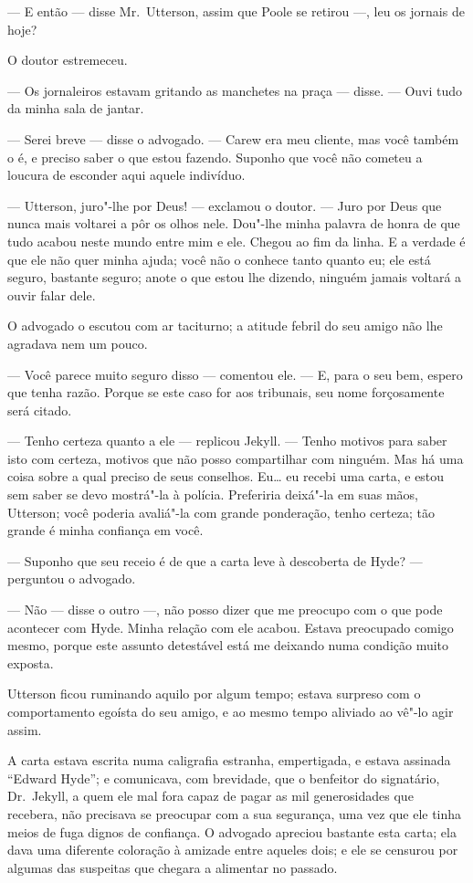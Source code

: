 --- E então --- disse Mr.~Utterson, assim que Poole se retirou ---, leu os
jornais de hoje?

O doutor estremeceu.

--- Os jornaleiros estavam gritando as manchetes na praça --- disse. ---
Ouvi tudo da minha sala de jantar.

--- Serei breve --- disse o advogado. --- Carew era meu cliente, mas você
também o é, e preciso saber o que estou fazendo. Suponho que você não
cometeu a loucura de esconder aqui aquele indivíduo.

--- Utterson, juro"-lhe por Deus! --- exclamou o doutor. --- Juro por Deus
que nunca mais voltarei a pôr os olhos nele.  Dou"-lhe minha palavra de
honra de que tudo acabou neste mundo entre mim e ele.  Chegou ao fim da
linha.  E a verdade é que ele não quer minha ajuda; você não o conhece
tanto quanto eu; ele está seguro, bastante seguro; anote o que estou
lhe dizendo, ninguém jamais voltará a ouvir falar dele. 

O advogado o escutou com ar taciturno; a atitude febril do seu amigo não
lhe agradava nem um pouco.

--- Você parece muito seguro disso --- comentou ele. --- E, para o seu bem,
espero que tenha razão.  Porque se este caso for aos tribunais, seu
nome forçosamente será citado.

--- Tenho certeza quanto a ele --- replicou Jekyll. --- Tenho motivos para
saber isto com certeza, motivos que não posso compartilhar com ninguém.
 Mas há uma coisa sobre a qual preciso de seus conselhos. Eu\ldots{} eu
recebi uma carta, e estou sem saber se devo mostrá"-la à polícia. 
Preferiria deixá"-la em suas mãos, Utterson; você poderia avaliá"-la com
grande ponderação, tenho certeza; tão grande é minha confiança em você.

--- Suponho que seu receio é de que a carta leve à descoberta de Hyde? ---
perguntou o advogado.

--- Não --- disse o outro ---, não posso dizer que me preocupo com o que
pode acontecer com Hyde.  Minha relação com ele acabou.  Estava
preocupado comigo mesmo, porque este assunto detestável está me
deixando numa condição muito exposta.

Utterson ficou ruminando aquilo por algum tempo; estava surpreso com o
comportamento egoísta do seu amigo, e ao mesmo tempo aliviado ao vê"-lo
agir assim.

A carta estava escrita numa caligrafia estranha, empertigada, e estava
assinada “Edward Hyde”; e comunicava, com brevidade, que o benfeitor do
signatário, Dr.~Jekyll, a quem ele mal fora capaz de pagar as mil
generosidades que recebera, não precisava se preocupar com a sua
segurança, uma vez que ele tinha meios de fuga dignos de confiança.  O
advogado apreciou bastante esta carta; ela dava uma diferente coloração
à amizade entre aqueles dois; e ele se censurou por algumas das
suspeitas que chegara a alimentar no passado.

